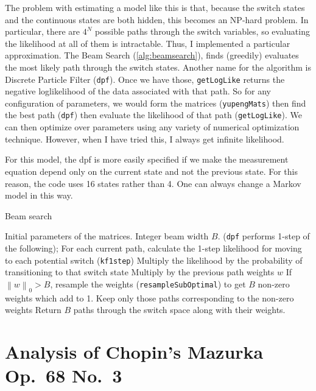 \documentclass[12pt]{article}
\newcommand{\norm}[1]{\left\lVert #1 \right\rVert}
\begin{document}
The problem with estimating a model like this is that, because the
switch states and the continuous states are both hidden, this becomes
an NP-hard problem. In particular, there are $4^N$ possible paths
through the switch variables, so evaluating the likelihood at all of
them is intractable. Thus, I implemented a particular
approximation. The Beam Search (\autoref{alg:beamsearch}), finds
(greedily) evaluates the most likely path through the switch
states. Another name for the algorithm is Discrete Particle Filter
(\texttt{dpf}). Once we have those, \texttt{getLogLike} returns the
negative 
loglikelihood of the data associated with that path. So for any
configuration of parameters, we would form the matrices
(\texttt{yupengMats}) then find the best path (\texttt{dpf}) then
evaluate the likelihood of that path (\texttt{getLogLike}). We can
then optimize over parameters using any variety of numerical
optimization technique. However, when I have tried this, I always get
infinite likelihood.

For this model, the dpf is more easily specified if we make the
measurement equation depend only on the current state and not the
previous state. For this reason, the code uses 16 states rather than
4. One can always change a Markov model in this way.

\begin{algorithm}[t!]
  \caption{Beam search\label{alg:beamsearch}}
  \begin{algorithmic}[1]
  Initial parameters of the matrices. Integer beam width $B$.
  \STATE (\texttt{dpf} performs 1-step of the following);
  \STATE For each current path, calculate the 1-step likelihood for
  moving to each potential switch (\texttt{kf1step})\;
  \STATE Multiply the likelihood by the probability of transitioning
  to that switch state\;
  \STATE Multiply by the previous path weights $w$\;
  \STATE If $\norm{w}_0>B$, resample the weights\;
  (\texttt{resampleSubOptimal}) to get $B$ non-zero weights which
  add to 1.\;
  \STATE Keep only those paths corresponding to the non-zero weights\;
  \ENDFOR
  \STATE Return $B$ paths through the switch space along with their weights.\;
\end{algorithmic}
\end{algorithm}


\section{Analysis of Chopin's Mazurka Op.\ 68 No.\ 3}
\label{sec:analys-chop-mazurka}
\end{document}

